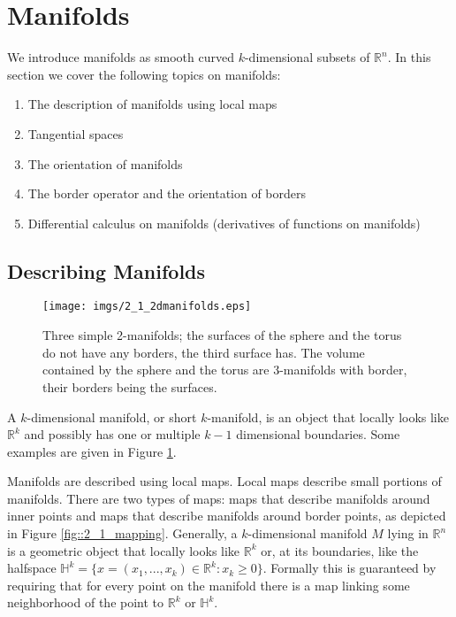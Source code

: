 \section{Manifolds}
\label{sec::2_Manifolds}
We introduce manifolds as smooth curved $k$-dimensional subsets of $\mathbb R^n$. %
In this section we cover the following topics on manifolds:
\begin{enumerate}
\item The description of manifolds using local maps
\item Tangential spaces
\item The orientation of manifolds
\item The border operator and the orientation of borders
\item Differential calculus on manifolds (derivatives of functions on manifolds)
\end{enumerate}
		
\subsection{Describing Manifolds}	

\begin{figure}
	\begin{center}
		\texttt{[image: imgs/2\_1\_2dmanifolds.eps]}
	\end{center}
		\caption{Three simple 2-manifolds; the surfaces of the sphere and the torus do not have any borders, the third surface has. The volume contained by the sphere and the torus are 3-manifolds with border, their borders being the surfaces.}
		\label{fig::2_1_manifold}
\end{figure}

A $k$-dimensional manifold, or short $k$-manifold, is an object that locally looks like $\mathbb{R}^k$ and possibly has one or multiple $k-1$ dimensional boundaries. Some examples are given in Figure \ref{fig::2_1_manifold}.

Manifolds are described using local maps. Local maps describe small portions of manifolds. There are two types of maps: maps that describe manifolds around inner points and maps that describe manifolds around border points, as depicted in Figure \ref{fig::2_1_mapping}. %
Generally, a $k$-dimensional manifold $M$ lying in $\mathbb R^n$ is a geometric object that locally looks like $\mathbb R^k$ or, at its boundaries, like the halfspace $\mathbb H^k = \{x= (x_1,...,x_k) \in \mathbb R^k : x_k \geq 0\}$.  Formally this is guaranteed by requiring that for every point on the manifold there is a map linking some neighborhood of the point to $\mathbb R^k$ or $\mathbb H^k$.

